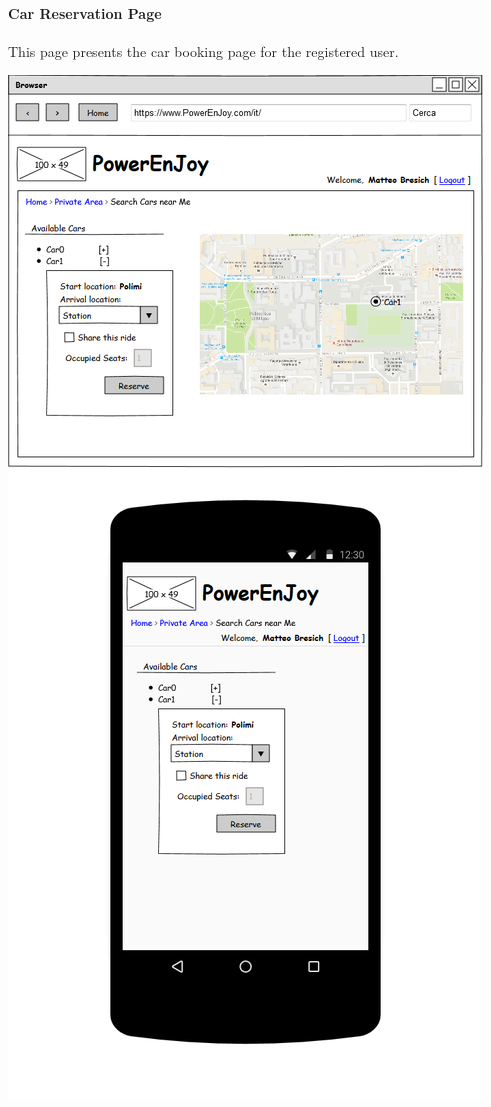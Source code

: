 \documentclass{article}
\begin{document}
			\paragraph{Car Reservation Page} This page presents the car booking page for the registered user.
			\begin{center}
				\includegraphics[width=0.6\linewidth]{"img/ui/search-car"}
			\end{center}
			\pagebreak
			
\end{document}
